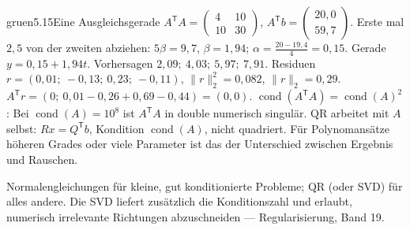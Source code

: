 \begin{loesungkarte}{gruen}{5.15}{Eine Ausgleichsgerade}
$A^{\mathsf T}A = \begin{pmatrix}4 & 10\\ 10 & 30\end{pmatrix}$, $A^{\mathsf T}b = \begin{pmatrix}20{,}0\\ 59{,}7\end{pmatrix}$. Erste mal $2{,}5$ von der zweiten abziehen: $5\beta = 9{,}7$, $\beta = 1{,}94$; $\alpha = \frac{20 - 19{,}4}4 = 0{,}15$. Gerade $y = 0{,}15 + 1{,}94t$.
Vorhersagen $2{,}09;\ 4{,}03;\ 5{,}97;\ 7{,}91$. Residuen $r = (0{,}01;\ -0{,}13;\ 0{,}23;\ -0{,}11)$, $\|r\|_2^{2} = 0{,}082$, $\|r\|_2 = 0{,}29$. $A^{\mathsf T}r = (0;\ 0{,}01 - 0{,}26 + 0{,}69 - 0{,}44) = (0, 0)$. \checkmark
{}
$\operatorname{cond}(A^{\mathsf T}A) = \operatorname{cond}(A)^{2}$: Bei $\operatorname{cond}(A) = 10^{8}$ ist $A^{\mathsf T}A$ in double numerisch singulär. QR arbeitet mit $A$ selbst: $Rx = Q^{\mathsf T}b$, Kondition $\operatorname{cond}(A)$, nicht quadriert. Für Polynomansätze höheren Grades oder viele Parameter ist das der Unterschied zwischen Ergebnis und Rauschen.
\begin{mitnehmen}\kastentext
Normalengleichungen für kleine, gut konditionierte Probleme; QR (oder SVD) für alles andere. Die SVD liefert zusätzlich die Konditionszahl und erlaubt, numerisch irrelevante Richtungen abzuschneiden --- Regularisierung, Band 19.
\end{mitnehmen}
\end{loesungkarte}

